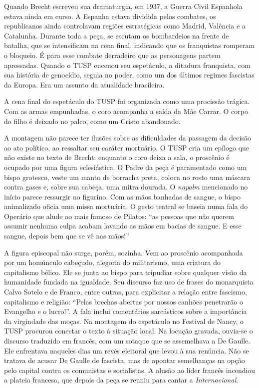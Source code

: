 Quando Brecht escreveu sua dramaturgia, em 1937, a Guerra Civil
Espanhola estava ainda em curso. A Espanha estava dividida pelos
combates, os republicanos ainda controlavam regiões estratégicas como
Madrid, Valência e a Catalunha. Durante toda a peça, se escutam os
bombardeios na frente de batalha, que se intensificam na cena final,
indicando que os franquistas romperam o bloqueio. É para esse combate
derradeiro que as personagens partem apressadas. Quando o TUSP encenou
seu espetáculo, a ditadura franquista, com sua história de genocídio,
seguia no poder, como um dos últimos regimes fascistas da Europa. Era um
assunto da atualidade brasileira.

A cena final do espetáculo do TUSP foi organizada como uma procissão
trágica. Com as armas empunhadas, o coro acompanha a saída da Mãe
Carrar. O corpo do filho é deixado no palco, como um Cristo abandonado.

A montagem não parece ter ilusões sobre as dificuldades da passagem da
decisão ao ato político, ao ressaltar seu caráter mortuário. O TUSP cria
um epílogo que não existe no texto de Brecht: enquanto o coro deixa a
sala, o proscênio é ocupado por uma figura eclesiástica. O Padre da peça
é paramentado como um bispo grotesco, veste um manto de borracha preta,
coloca no rosto uma máscara contra gases e, sobre sua cabeça, uma mitra
dourada. O \textit{napalm} mencionado no início parece ressurgir no
figurino. Com as mãos banhadas de sangue, o bispo animalizado oficia uma
missa mortuária. O gesto teatral se baseia numa fala do Operário que
alude ao mais famoso de Pilatos: “as pessoas que não querem assumir
nenhuma culpa acabam lavando as mãos em bacias de sangue. E esse sangue,
depois bem que se vê nas mãos!”

A figura episcopal não surge, porém, sozinha. Vem ao proscênio
acompanhada por um homúnculo cabeçudo, alegoria do militarismo, uma
criatura do capitalismo bélico. Ele se junta ao bispo para tripudiar
sobre qualquer visão da humanidade fundada na igualdade. Seu discurso
faz uso de frases do monarquista Calvo Sotelo e de Franco, entre outras,
para explicitar a relação entre fascismo, capitalismo e religião: “Pelas
brechas abertas por nossos canhões penetrarão o Evangelho e o lucro!”. A
fala inclui comentários sarcásticos sobre a importância da virgindade
das moças. Na montagem do espetáculo no Festival de Nancy, o TUSP
procurou conectar o texto à situação local. Na locução gravada, ouvia-se
o discurso traduzido em francês, com um sotaque que se assemelhava a De
Gaulle. Ele enfrentava naqueles dias um revés eleitoral que levou à sua
renúncia. Não se tratava de acusar De Gaulle de fascista, mas de apontar
semelhanças na opção pelo capital contra os comunistas e socialistas. A
alusão ao líder francês incendiou a plateia francesa, que depois da peça
se reuniu para cantar a \textit{Internacional}.


